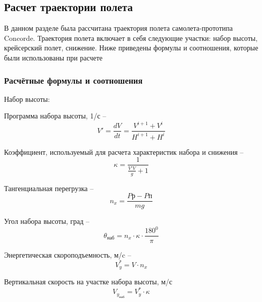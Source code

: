 \subsection{Расчет траектории полета}

В данном разделе была рассчитана траектория полета самолета-прототипа
Concorde. Траектория полета включает в себя следующие участки: набор высоты,
крейсерский полет, снижение. Ниже приведены формулы и соотношения,
которые были использованы при расчете

\subsubsection{Расчётные формулы и соотношения}
\label{sec:Расчётные формулы и соотношения}

\begin{center}
    Набор высоты:
\end{center}

Программа набора высоты, 1/с -- 
\begin{equation}
\label{eq:Программа набора}
    V' = \frac{dV}{dt} = \frac{V^{i+1}+V^{i}}{H^{i+1}+H^{i}}
\end{equation}

Коэффициент, используемый для расчета характеристик набора и снижения --  
\begin{equation}
    \label{eq:Коэффициент}
    \kappa = \frac{1}{\frac{V'V}{g}+1}
\end{equation}

Тангенциальная перегрузка --  
\begin{equation}
    \label{eq:Тангенциальная перегрузка }
    n_x = \frac{P\text{р}-P\text{п}}{mg}
\end{equation}

Угол набора высоты, град -- 
\begin{equation}
    \label{eq:Угол набора высоты}
    \theta_\text{наб} = n_x \cdot \kappa \cdot \frac{180^0}{\pi}
\end{equation}

Энергетическая скороподъемность, м/c -- 
\begin{equation}
    \label{eq:Энергетическая скороподъемность}
    V_y^* = V \cdot n_x
\end{equation}

Вертикальная скорость на участке набора высоты, м/с
\begin{equation}
    \label{eq:Вертикальная скорость на участке набора высоты}
    V_{y_\text{наб}} = V_y^* \cdot \kappa
\end{equation}

